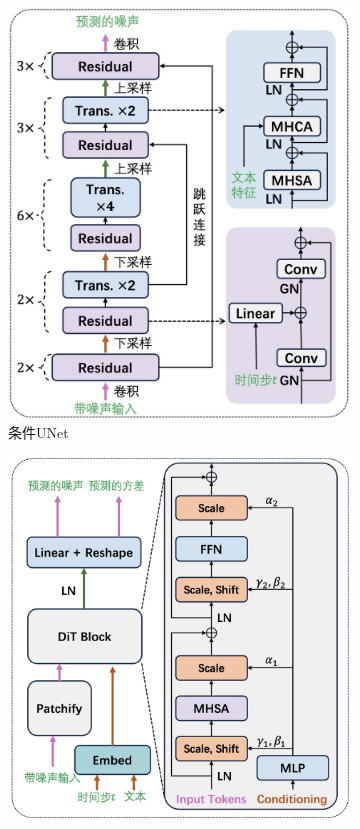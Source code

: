 \documentclass[11pt,a4paper,UTF8]{ctexart}
\begin{document}
\begin{figure}[htbp]
    \centering
    \begin{subfigure}[b]{0.46\textwidth}
        \centering
        \includegraphics[width=\linewidth]{img/C-UNet.jpg}
        \caption{条件UNet}
        \label{fig:c-unet}
    \end{subfigure}
    \hfill
    \begin{subfigure}[b]{0.52\textwidth}
        \centering
        \includegraphics[width=\linewidth]{img/DiT.jpg}

\end{subfigure}
\end{figure}
\end{document}
